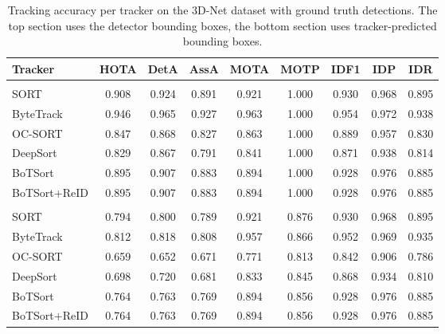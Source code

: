 \documentclass[12pt,oneside,bibtotoc,liststotoc]{scrbook}
\begin{document}
\begin{table}[H]
    \centering
    \scriptsize
    \begin{tabular}{|l cccccccc|}
        \toprule
        \rowcolor{white}
        Tracker      & HOTA  & DetA  & AssA  & MOTA  & MOTP  & IDF1  & IDP   & IDR   \\
        \midrule
        \rowcolor{white}
        \multicolumn{9}{|l|}{\textit{Detection bounding boxes as output}}              \\
        \midrule
        SORT         & 0.908 & 0.924 & 0.891 & 0.921 & 1.000 & 0.930 & 0.968 & 0.895 \\
        ByteTrack    & 0.946 & 0.965 & 0.927 & 0.963 & 1.000 & 0.954 & 0.972 & 0.938 \\
        OC-SORT      & 0.847 & 0.868 & 0.827 & 0.863 & 1.000 & 0.889 & 0.957 & 0.830 \\
        DeepSort     & 0.829 & 0.867 & 0.791 & 0.841 & 1.000 & 0.871 & 0.938 & 0.814 \\
        BoTSort      & 0.895 & 0.907 & 0.883 & 0.894 & 1.000 & 0.928 & 0.976 & 0.885 \\
        BoTSort+ReID & 0.895 & 0.907 & 0.883 & 0.894 & 1.000 & 0.928 & 0.976 & 0.885 \\
        \midrule
        \rowcolor{white}
        \multicolumn{9}{|l|}{\textit{Tracker-predicted bounding boxes as output}}      \\
        \midrule
        SORT         & 0.794 & 0.800 & 0.789 & 0.921 & 0.876 & 0.930 & 0.968 & 0.895 \\
        ByteTrack    & 0.812 & 0.818 & 0.808 & 0.957 & 0.866 & 0.952 & 0.969 & 0.935 \\
        OC-SORT      & 0.659 & 0.652 & 0.671 & 0.771 & 0.813 & 0.842 & 0.906 & 0.786 \\
        DeepSort     & 0.698 & 0.720 & 0.681 & 0.833 & 0.845 & 0.868 & 0.934 & 0.810 \\
        BoTSort      & 0.764 & 0.763 & 0.769 & 0.894 & 0.856 & 0.928 & 0.976 & 0.885 \\
        BoTSort+ReID & 0.764 & 0.763 & 0.769 & 0.894 & 0.856 & 0.928 & 0.976 & 0.885 \\
        \bottomrule
    \end{tabular}
    \caption{
        Tracking accuracy per tracker on the 3D-Net dataset with ground truth detections. 
        The top section uses the detector bounding boxes, the bottom section uses 
        tracker-predicted bounding boxes.
    }
    \vspace{-2em}
    \label{tab:tracker_evaluation_metrics}
\end{table}
\end{document}
